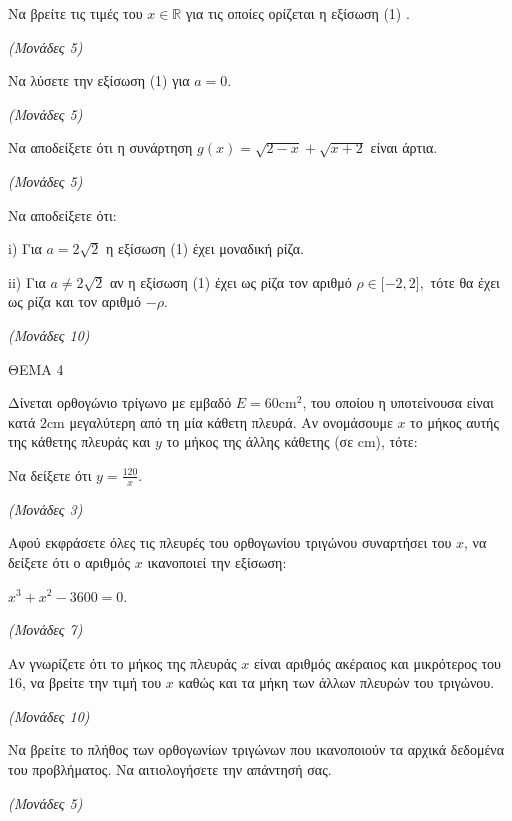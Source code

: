 \documentclass[11pt,a4paper,twoside]{book}
\newcommand{\monades}[1]{\hfill \textit{(Μονάδες #1)}}
\begin{document}
\begin{alist}
\item Να βρείτε τις τιμές του $x \in {\mathbb{R}}$ για τις οποίες ορίζεται η εξίσωση (1) .

\monades{5}

\item Να λύσετε την εξίσωση (1) για $a = 0.$

\monades{5}

\item Να αποδείξετε ότι η συνάρτηση $g(x) = \sqrt{2 - x} + \sqrt{x + 2}$ είναι άρτια.

\monades{5}

\item Να αποδείξετε ότι:

i) Για $a = 2\sqrt{2}$ η εξίσωση (1) έχει μοναδική ρίζα.

ii) Για $a \neq 2\sqrt{2}$ αν η εξίσωση (1) έχει ως ρίζα τον αριθμό $\rho \in \lbrack - 2,2\rbrack,$ τότε θα έχει ως ρίζα και τον αριθμό $- \rho.$

\monades{10}
\end{alist}

\vspace{4mm}

ΘΕΜΑ 4

Δίνεται ορθογώνιο τρίγωνο με εμβαδό $E = 60\text{cm}^2$, του οποίου η υποτείνουσα είναι κατά $2\text{cm}$ μεγαλύτερη από τη μία κάθετη πλευρά. Αν ονομάσουμε $x$ το μήκος αυτής της κάθετης πλευράς και $y$ το μήκος της άλλης κάθετης (σε $\text{cm}$), τότε:

\begin{alist}
\item

\end{alist}
\begin{alist}
\item
  Να δείξετε ότι $y = \frac{120}{x}$.

\monades{3}


\end{alist}
\begin{alist}
\item
  Αφού εκφράσετε όλες τις πλευρές του ορθογωνίου τριγώνου συναρτήσει του $x$, να δείξετε ότι ο αριθμός $x$ ικανοποιεί την εξίσωση:

$x^3 + x^2 - 3600 = 0$.

\monades{7}

\item Αν γνωρίζετε ότι το μήκος της πλευράς $x$ είναι αριθμός ακέραιος και μικρότερος του 16, να βρείτε την τιμή του $x$ καθώς και τα μήκη των άλλων πλευρών του τριγώνου.

\monades{10}

\item Να βρείτε το πλήθος των ορθογωνίων τριγώνων που ικανοποιούν τα αρχικά δεδομένα του προβλήματος. Να αιτιολογήσετε την απάντησή σας.

\monades{5}
\end{alist}
\end{document}
